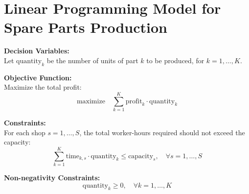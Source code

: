 \documentclass{article}
\begin{document}
\section*{Linear Programming Model for Spare Parts Production}

\textbf{Decision Variables:} \\
Let \( \text{quantity}_k \) be the number of units of part \( k \) to be produced, for \( k = 1, \ldots, K \).

\textbf{Objective Function:} \\
Maximize the total profit:
\[
\text{maximize} \quad \sum_{k=1}^{K} \text{profit}_k \cdot \text{quantity}_k
\]

\textbf{Constraints:} \\
For each shop \( s = 1, \ldots, S \), the total worker-hours required should not exceed the capacity:
\[
\sum_{k=1}^{K} \text{time}_{k, s} \cdot \text{quantity}_k \leq \text{capacity}_s, \quad \forall s = 1, \ldots, S
\]

\textbf{Non-negativity Constraints:}
\[
\text{quantity}_k \geq 0, \quad \forall k = 1, \ldots, K
\]
\end{document}
